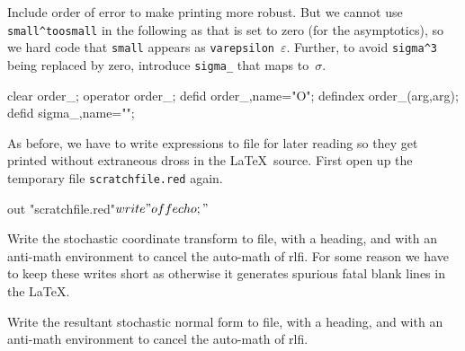 \documentclass[11pt,a5paper]{article}
\begin{document}
Include order of error to make printing more robust. But we
cannot use \verb|small^toosmall| in the following as that is
set to zero (for the asymptotics), so we hard code that
\verb|small| appears as \verb|varepsilon|~\(\varepsilon\). 
Further, to avoid \verb|sigma^3| being replaced by zero,
introduce \verb|sigma_| that maps to~\(\sigma\).
\begin{reduce}
clear order_;  operator order_;
defid order_,name="O";
defindex order_(arg,arg);
defid sigma_,name="\sigma";
\end{reduce}


As before, we have to write expressions to file for later
reading so they get printed without extraneous dross in the
\LaTeX\ source. First open up the temporary file
\verb|scratchfile.red| again.
\begin{reduce}
out "scratchfile.red"$
write "off echo;"$ %
\end{reduce}

Write the stochastic coordinate transform to file, with a
heading, and with an anti-math environment to cancel the
auto-math of rlfi. For some reason we have to keep these
writes short as otherwise it generates spurious fatal
blank lines in the \LaTeX.

Write the resultant stochastic normal form to file, with a
heading, and with an anti-math environment to cancel the
auto-math of rlfi.
\end{document}
